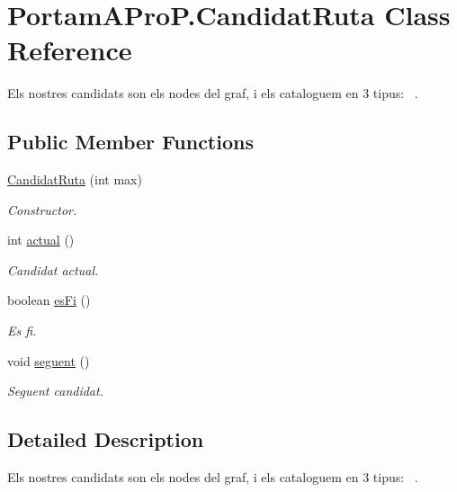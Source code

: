 \hypertarget{class_portam_a_pro_p_1_1_candidat_ruta}{}\section{Portam\+A\+Pro\+P.\+Candidat\+Ruta Class Reference}
\label{class_portam_a_pro_p_1_1_candidat_ruta}


Els nostres candidats son els nodes del graf, i els cataloguem en 3 tipus\+:~\newline
.  


\subsection*{Public Member Functions}
\begin{DoxyCompactItemize}
\item 
\hyperlink{class_portam_a_pro_p_1_1_candidat_ruta_a8527d8e2dde3cbf74d6ef61d3fc9d2bf}{Candidat\+Ruta} (int max)
\begin{DoxyCompactList}\small\item\em Constructor. \end{DoxyCompactList}\item 
int \hyperlink{class_portam_a_pro_p_1_1_candidat_ruta_aea24df02d878f7c7040954f6b6a31ff0}{actual} ()
\begin{DoxyCompactList}\small\item\em Candidat actual. \end{DoxyCompactList}\item 
boolean \hyperlink{class_portam_a_pro_p_1_1_candidat_ruta_a549265167fa19ae4845edf342f9e2671}{es\+Fi} ()
\begin{DoxyCompactList}\small\item\em Es fi. \end{DoxyCompactList}\item 
void \hyperlink{class_portam_a_pro_p_1_1_candidat_ruta_a174caa14ac06161023eddb0660974e64}{seguent} ()
\begin{DoxyCompactList}\small\item\em Seguent candidat. \end{DoxyCompactList}\end{DoxyCompactItemize}


\subsection{Detailed Description}
Els nostres candidats son els nodes del graf, i els cataloguem en 3 tipus\+:~\newline
. 


